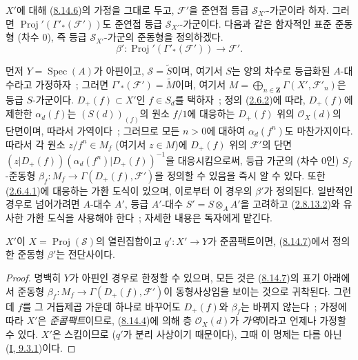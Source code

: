 \begin{env}[8.14.7]
\label{II.8.14.7-ko}
$X'$에 대해 (\hyperref[II.8.14.6-ko]{8.14.6})의 가정을 그대로 두고,
$\mathcal{F}'$을 준연접 등급 $\mathcal{S}_{X'}$-가군이라 하자. 그러면
$\operatorname{Proj}'(\Gamma'_*(\mathcal{F}'))$도 준연접 등급
$\mathcal{S}_{X'}$-가군이다. 다음과 같은 함자적인 표준 준동형
(차수 $0$), 즉 등급 $\mathcal{S}_{X'}$-가군의 준동형을 정의하겠다.
\begin{equation}
\label{II.8.14.7.1-ko}
  \beta':\operatorname{Proj}'(\Gamma'_*(\mathcal{F}'))\to\mathcal{F}'.
\tag{8.14.7.1}
\end{equation}

먼저 $Y=\operatorname{Spec}(A)$가 아핀이고,
$\mathcal{S}=\widetilde{S}$이며, 여기서 $S$는 양의 차수로 등급화된
$A$-대수라고 가정하자~; 그러면 $\Gamma'_*(\mathcal{F}')=\widetilde{M}$이며,
여기서 $M=\bigoplus_{n\in\mathbf{Z}}\Gamma(X',\mathcal{F}'_n)$은 등급
$S$-가군이다. $D_+(f)\subset X'$인 $f\in S_d$를 택하자~; 정의
(\hyperref[II.2.6.2-ko]{2.6.2})에 따라, $D_+(f)$에 제한한
$\alpha_d(f)$는 $(S(d))_{(f)}$의 원소 $f/1$에 대응하는 $D_+(f)$ 위의
$\mathcal{O}_X(d)$의 단면이며, 따라서 가역이다~; 그러므로 모든 $n>0$에
대하여 $\alpha_d(f^n)$도 마찬가지이다. 따라서 각 원소
$z/f^n\in M_f$ (여기서 $z\in M$)에 $D_+(f)$ 위의 $\mathcal{F}'$의 단면
$(z|D_+(f))(\alpha_d(f^n)|D_+(f))^{-1}$을 대응시킴으로써, 등급 가군의
(차수 $0$인) $S_f$-준동형
$\beta_f:M_f\to\Gamma(D_+(f),\mathcal{F}')$을 정의할 수 있음을 즉시
알 수 있다. 또한 (\hyperref[II.2.6.4.1-ko]{2.6.4.1})에 대응하는 가환
도식이 있으며, 이로부터 이 경우의 $\beta'$가 정의된다. 일반적인 경우로
넘어가려면 $A$-대수 $A'$, 등급 $A'$-대수 $S'=S\otimes_A A'$을
고려하고 (\hyperref[II.2.8.13.2-ko]{2.8.13.2})와 유사한 가환 도식을
사용해야 한다~; 자세한 내용은 독자에게 맡긴다.
\end{env}

\begin{proposition}[8.14.8]
\label{II.8.14.8-ko}
$X'$이 $X=\operatorname{Proj}(\mathcal{S})$의 열린집합이고
$q':X'\to Y$가 준콤팩트이면, (\hyperref[II.8.14.7-ko]{8.14.7})에서
정의한 준동형 $\beta'$는 전단사이다.
\end{proposition}

\begin{proof}
명백히 $Y$가 아핀인 경우로 한정할 수 있으며, 모든 것은
(\hyperref[II.8.14.7-ko]{8.14.7})의 표기 아래에서 준동형
$\beta_f:M_f\to\Gamma(D_+(f),\mathcal{F}')$이 동형사상임을 보이는 것으로
귀착된다. 그런데 $f$를 그 거듭제곱 가운데 하나로 바꾸어도 $D_+(f)$와
$\beta_f$는 바뀌지 않는다~; 가정에 따라 $X'$은 \emph{준콤팩트}이므로,
(\hyperref[II.8.14.4-ko]{8.14.4})에 의해 층 $\mathcal{O}_X(d)$가
\emph{가역}이라고 언제나 가정할 수 있다. $X'$은 스킴이므로
($q'$가 분리 사상이기 때문이다), 그때 이 명제는 다름 아닌
(\hyperref[I.9.3.1-ko]{I, 9.3.1})이다.
\end{proof}

